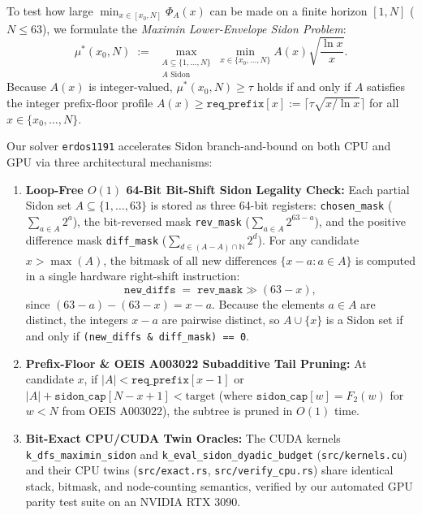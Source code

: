 \documentclass[11pt,reqno]{amsart}
\theoremstyle{definition}
\theoremstyle{remark}
\begin{document}
To test how large $\min_{x \in [x_0, N]} \Phi_A(x)$ can be made on a finite horizon $[1, N]$ ($N \le 63$), we formulate the \emph{Maximin Lower-Envelope Sidon Problem}:
\begin{equation}\label{eq:maximin_def}
  \mu^*(x_0, N) \;:=\; \max_{\substack{A \subseteq \{1, \dots, N\} \\ A \text{ Sidon}}} \min_{x \in \{x_0, \dots, N\}} A(x)\sqrt{\frac{\ln x}{x}}.
\end{equation}
Because $A(x)$ is integer-valued, $\mu^*(x_0, N) \ge \tau$ holds if and only if $A$ satisfies the integer prefix-floor profile $A(x) \ge \texttt{req\_prefix}[x] := \lceil \tau \sqrt{x/\ln x} \rceil$ for all $x \in \{x_0, \dots, N\}$.

Our solver \texttt{erdos1191} accelerates Sidon branch-and-bound on both CPU and GPU via three architectural mechanisms:
\begin{enumerate}
  \item \textbf{Loop-Free $O(1)$ 64-Bit Bit-Shift Sidon Legality Check:} Each partial Sidon set $A \subseteq \{1, \dots, 63\}$ is stored as three 64-bit registers: \texttt{chosen\_mask} ($\sum_{a\in A} 2^a$), the bit-reversed mask \texttt{rev\_mask} ($\sum_{a\in A} 2^{63-a}$), and the positive difference mask \texttt{diff\_mask} ($\sum_{d \in (A-A)\cap\mathbb{N}} 2^d$). For any candidate $x > \max(A)$, the bitmask of all new differences $\{x - a : a \in A\}$ is computed in a single hardware right-shift instruction:
  \[
    \texttt{new\_diffs} \;=\; \texttt{rev\_mask} \gg (63 - x),
  \]
  since $(63 - a) - (63 - x) = x - a$. Because the elements $a \in A$ are distinct, the integers $x - a$ are pairwise distinct, so $A \cup \{x\}$ is a Sidon set if and only if \texttt{(new\_diffs \& diff\_mask) == 0}.
  \item \textbf{Prefix-Floor \& OEIS A003022 Subadditive Tail Pruning:} At candidate $x$, if $|A| < \texttt{req\_prefix}[x-1]$ or $|A| + \texttt{sidon\_cap}[N - x + 1] < \text{target}$ (where $\texttt{sidon\_cap}[w] = F_2(w)$ for $w < N$ from OEIS A003022), the subtree is pruned in $O(1)$ time.
  \item \textbf{Bit-Exact CPU/CUDA Twin Oracles:} The CUDA kernels \texttt{k\_dfs\_maximin\_sidon} and \texttt{k\_eval\_sidon\_dyadic\_budget} (\texttt{src/kernels.cu}) and their CPU twins (\texttt{src/exact.rs}, \texttt{src/verify\_cpu.rs}) share identical stack, bitmask, and node-counting semantics, verified by our automated GPU parity test suite on an NVIDIA RTX 3090.
\end{enumerate}
\end{document}
